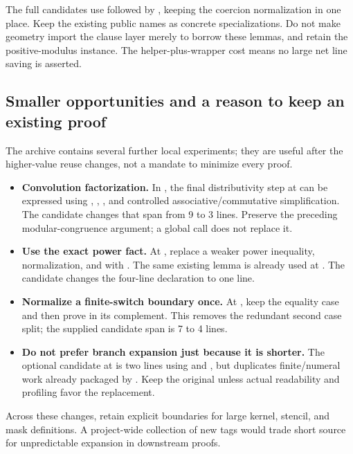 The full candidates use  followed by
, keeping the coercion normalization in one place.
Keep the existing public names as concrete specializations. Do not make
geometry import the clause layer merely to borrow these lemmas, and retain
the positive-modulus instance. The helper-plus-wrapper cost means no large
net line saving is asserted.

\subsection{Smaller opportunities and a reason to keep an existing proof}

The archive contains several further local experiments; they are useful
after the higher-value reuse changes, not a mandate to minimize every proof.

\begin{itemize}
\item \textbf{Convolution factorization.}
In , the final distributivity
step at  can be expressed using
, , , and controlled
associative/commutative simplification. The candidate changes that span from
9 to 3 lines. Preserve the preceding modular-congruence argument; a global
 call does not replace it.
\item \textbf{Use the exact power fact.}
At , replace a weaker power inequality,
normalization, and  with
. The same existing lemma is already
used at . The candidate changes the
four-line  declaration to one line.
\item \textbf{Normalize a finite-switch boundary once.}
At , keep the equality case and
then prove  in its complement. This
removes the redundant second case split; the supplied candidate span is
7 to 4 lines.
\item \textbf{Do not prefer branch expansion just because it is shorter.}
The optional  candidate at
 is two lines using
 and , but duplicates finite/numeral work
already packaged by . Keep the original unless actual
readability and profiling favor the replacement.
\end{itemize}

Across these changes, retain explicit  boundaries for large
kernel, stencil, and mask definitions. A project-wide collection of new
\code{[simp]} tags would trade short source for unpredictable expansion in
downstream proofs.

